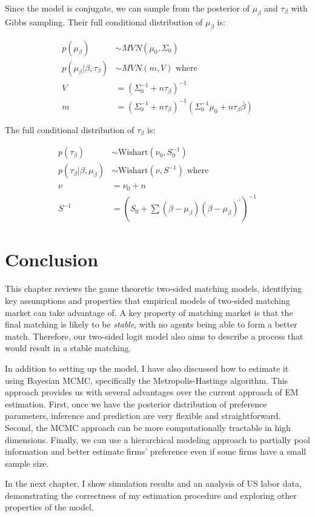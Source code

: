 Since the model is conjugate, we can sample from the posterior of $\mu_{\beta}$
and $\tau_{\beta}$ with Gibbs sampling. Their full conditional distribution of
$\mu_{\beta}$ is:

\begin{align}
  p(\mu_{\beta}) &\sim MVN(\mu_0, \Sigma_0) \\
  p(\mu_{\beta} | \beta, \tau_{\beta}) &\sim MVN(m, V) \text{ where } \\
  V &= (\Sigma_0^{-1} + n \tau_{\beta})^{-1} \\
  m &= (\Sigma_0^{-1} + n \tau_{\beta})^{-1} (\Sigma_0^{-1}\mu_0 + n \tau_{\beta} \bar \beta)
\end{align}

The full conditional distribution of $\tau_{\beta}$ is:

\begin{align}
  p(\tau_{\beta}) &\sim \text{Wishart}(\nu_0, S_0^{-1}) \\
  p(\tau_{\beta} | \beta, \mu_{\beta}) &\sim \text{Wishart}(\nu, S^{-1}) \text{ where } \\
  \nu &= \nu_0 + n \\
  S^{-1} &= \left(S_0 + \sum (\beta - \mu_{\beta})(\beta - \mu_{\beta})^{\prime}\right)^{-1}
\end{align}

\section{Conclusion}

This chapter reviews the game theoretic two-sided matching models, identifying
key assumptions and properties that empirical models of two-sided matching market
can take advantage of. A key property of matching market is that the final
matching is likely to be \textit{stable}, with no agents being able to form a
better match. Therefore, our two-sided logit model also aims to describe a
process that would result in a stable matching.

In addition to setting up the model, I have also discussed how to estimate it
using Bayesian MCMC, specifically the Metropolis-Hastings algorithm. This
approach provides us with several advantages over the current approach of EM
estimation. First, once we have the posterior distribution of preference
parameters, inference and prediction are very flexible and straightforward.
Second, the MCMC approach can be more computationally tractable in high
dimensions. Finally, we can use a hierarchical modeling approach to partially
pool information and better estimate firms' preference even if some firms have a
small sample size.

In the next chapter, I show simulation results and an analysis of US labor data,
demonstrating the correctness of my estimation procedure and exploring other
properties of the model.


